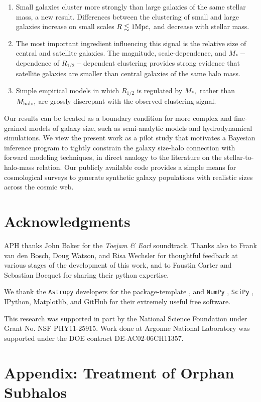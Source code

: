 \documentclass[usenatbib,usegraphicx,letterpaper]{mn2e}
\newcommand{\ben}{\begin{enumerate}}
\newcommand{\een}{\end{enumerate}}
\newcommand{\rhalf}{R_{1/2}}
\newcommand{\mstar}{M_{\ast}}
\newcommand{\mhalo}{M_{\rm halo}}
\newcommand{\rvir}{R_{\rm vir}}
\newcommand{\rmpeak}{R_{\rm M_{peak}}}
\newcommand{\rspeak}{{R_{\rm s,}}_{\rm M_{peak}}}
\newcommand{\mpc}{{\rm Mpc}}
\begin{document}
\ben
\item Small galaxies cluster more strongly than large galaxies of the same stellar mass, a new result. Differences between the clustering of small and large galaxies increase on small scales $R\lesssim1\mpc,$ and decrease with stellar mass.
\item The most important ingredient influencing this signal is the relative size of central and satellite galaxies. The magnitude, scale-dependence, and $\mstar-$dependence of $\rhalf-$dependent clustering provides strong evidence that satellite galaxies are smaller than central galaxies of the same halo mass.
\item Simple empirical models in which $\rhalf$ is regulated by $\mstar,$ rather than $\mhalo,$ are grossly discrepant with the observed clustering signal.
\een

Our results can be treated as a boundary condition for more complex and fine-grained models of galaxy size, such as semi-analytic models and hydrodynamical simulations. We view the present work as a pilot study that motivates a Bayesian inference program to tightly constrain the galaxy size-halo connection with forward modeling techniques, in direct analogy to the literature on the stellar-to-halo-mass relation. Our publicly available code provides a simple means for cosmological surveys to generate synthetic galaxy populations with realistic sizes across the cosmic web.

\section*{Acknowledgments}

APH thanks John Baker for the {\em Toejam \& Earl} soundtrack. Thanks also to Frank van den Bosch, Doug Watson, and Risa Wechsler for thoughtful feedback at various stages of the development of this work, and to Faustin Carter and Sebastian Bocquet for sharing their python expertise. 

We thank the {\tt Astropy} developers for the package-template \citep{astropy}, and {\tt NumPy} \citep{numpy_ndarray}, {\tt SciPy} \citep{scipy}, IPython, Matplotlib, and GitHub for their extremely useful free software.

This research was supported in part by the National Science Foundation under Grant No. NSF PHY11-25915. Work done at Argonne National Laboratory was supported under the DOE contract DE-AC02-06CH11357.



\section*{Appendix: Treatment of Orphan Subhalos}
\end{document}

